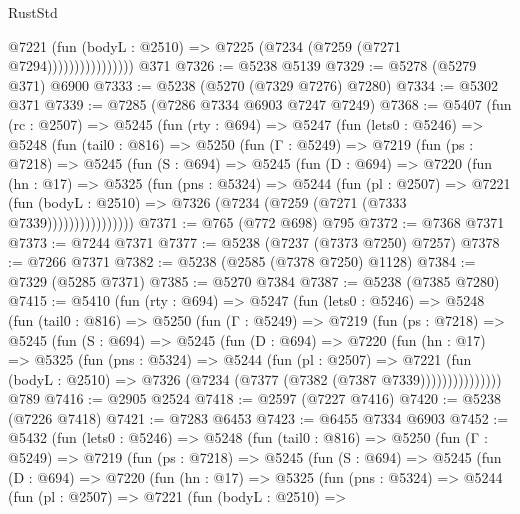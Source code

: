 \begin{lexlean}{RustStd}
\begin{coremodule}
                          @7221
                            (fun (bodyL : @2510) => @7225 (@7234 (@7259 (@7271 @7294))))))))))))))))
    @371
@7326 := @5238 @5139
@7329 := @5278 (@5279 @371) @6900
@7333 := @5238 (@5270 (@7329 @7276) @7280)
@7334 := @5302 @371
@7339 := @7285 (@7286 @7334 @6903 @7247 @7249)
@7368 := @5407
    (fun (rc : @2507) =>
    @5245
      (fun (rty : @694) =>
      @5247
        (fun (lets0 : @5246) =>
        @5248
          (fun (tail0 : @816) =>
          @5250
            (fun (Γ : @5249) =>
            @7219
              (fun (ps : @7218) =>
              @5245
                (fun (S : @694) =>
                @5245
                  (fun (D : @694) =>
                  @7220
                    (fun (hn : @17) =>
                    @5325
                      (fun (pns : @5324) =>
                      @5244
                        (fun (pl : @2507) =>
                        @7221
                          (fun (bodyL : @2510) =>
                          @7326 (@7234 (@7259 (@7271 (@7333 @7339))))))))))))))))
@7371 := @765 (@772 @698) @795
@7372 := @7368 @7371
@7373 := @7244 @7371
@7377 := @5238 (@7237 (@7373 @7250) @7257)
@7378 := @7266 @7371
@7382 := @5238 (@2585 (@7378 @7250) @1128)
@7384 := @7329 (@5285 @7371)
@7385 := @5270 @7384
@7387 := @5238 (@7385 @7280)
@7415 := @5410
    (fun (rty : @694) =>
    @5247
      (fun (lets0 : @5246) =>
      @5248
        (fun (tail0 : @816) =>
        @5250
          (fun (Γ : @5249) =>
          @7219
            (fun (ps : @7218) =>
            @5245
              (fun (S : @694) =>
              @5245
                (fun (D : @694) =>
                @7220
                  (fun (hn : @17) =>
                  @5325
                    (fun (pns : @5324) =>
                    @5244
                      (fun (pl : @2507) =>
                      @7221
                        (fun (bodyL : @2510) =>
                        @7326 (@7234 (@7377 (@7382 (@7387 @7339)))))))))))))))
    @789
@7416 := @2905 @2524
@7418 := @2597 (@7227 @7416)
@7420 := @5238 (@7226 @7418)
@7421 := @7283 @6453
@7423 := @6455 @7334 @6903
@7452 := @5432
    (fun (lets0 : @5246) =>
    @5248
      (fun (tail0 : @816) =>
      @5250
        (fun (Γ : @5249) =>
        @7219
          (fun (ps : @7218) =>
          @5245
            (fun (S : @694) =>
            @5245
              (fun (D : @694) =>
              @7220
                (fun (hn : @17) =>
                @5325
                  (fun (pns : @5324) =>
                  @5244
                    (fun (pl : @2507) =>
                    @7221
                      (fun (bodyL : @2510) =>

\end{coremodule}
\end{lexlean}
